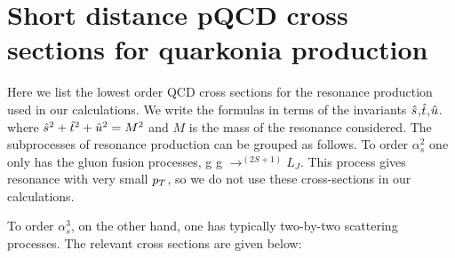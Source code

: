 \documentclass[aps,prc,preprint,superscriptaddress,showpacs,showkeys,amsmath]{revtex4-1}
\begin{document}
\newpage

\appendix

\section{Short distance pQCD cross sections for quarkonia production}
\label{section:pqcd}
Here we list the lowest order QCD cross sections for the resonance production used 
in our calculations. We write the formulas in terms of the invariants ${\hat{s}}$,${\hat{t}}$,${\hat{u}}$.
where ${\hat{s}}^2 + {\hat{t}}^2 + {\hat{u}}^2 = M^2$ and $M$ is the mass of the resonance considered.
The subprocesses of resonance production can be
grouped as follows.
To order $\alpha_{s}^{2}$ one only has the
gluon fusion processes, g g $\rightarrow ^{(2S+1)}L_{J}$. This 
process gives resonance with very small $p_{T}$, so we do not 
use these cross-sections in our calculations.

To order $\alpha_{s}^{3}$, on the other hand, one has typically
two-by-two scattering processes. The relevant cross
sections are given below:
\end{document}

